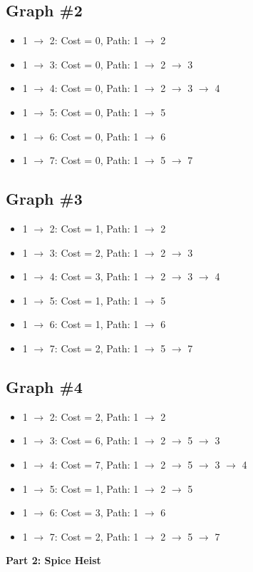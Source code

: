 \documentclass[12pt,letterpaper, onecolumn]{exam}
\begin{document}
\subsection*{Graph \#2}
\begin{itemize}[noitemsep, topsep=0pt]
    \item 1 $\rightarrow$ 2: Cost = 0, Path: 1 $\rightarrow$ 2
    \item 1 $\rightarrow$ 3: Cost = 0, Path: 1 $\rightarrow$ 2 $\rightarrow$ 3
    \item 1 $\rightarrow$ 4: Cost = 0, Path: 1 $\rightarrow$ 2 $\rightarrow$ 3 $\rightarrow$ 4
    \item 1 $\rightarrow$ 5: Cost = 0, Path: 1 $\rightarrow$ 5
    \item 1 $\rightarrow$ 6: Cost = 0, Path: 1 $\rightarrow$ 6
    \item 1 $\rightarrow$ 7: Cost = 0, Path: 1 $\rightarrow$ 5 $\rightarrow$ 7
\end{itemize}

\subsection*{Graph \#3}
\begin{itemize}[noitemsep, topsep=0pt]
    \item 1 $\rightarrow$ 2: Cost = 1, Path: 1 $\rightarrow$ 2
    \item 1 $\rightarrow$ 3: Cost = 2, Path: 1 $\rightarrow$ 2 $\rightarrow$ 3
    \item 1 $\rightarrow$ 4: Cost = 3, Path: 1 $\rightarrow$ 2 $\rightarrow$ 3 $\rightarrow$ 4
    \item 1 $\rightarrow$ 5: Cost = 1, Path: 1 $\rightarrow$ 5
    \item 1 $\rightarrow$ 6: Cost = 1, Path: 1 $\rightarrow$ 6
    \item 1 $\rightarrow$ 7: Cost = 2, Path: 1 $\rightarrow$ 5 $\rightarrow$ 7
\end{itemize}

\subsection*{Graph \#4}
\begin{itemize}[noitemsep, topsep=0pt]
    \item 1 $\rightarrow$ 2: Cost = 2, Path: 1 $\rightarrow$ 2
    \item 1 $\rightarrow$ 3: Cost = 6, Path: 1 $\rightarrow$ 2 $\rightarrow$ 5 $\rightarrow$ 3
    \item 1 $\rightarrow$ 4: Cost = 7, Path: 1 $\rightarrow$ 2 $\rightarrow$ 5 $\rightarrow$ 3 $\rightarrow$ 4
    \item 1 $\rightarrow$ 5: Cost = 1, Path: 1 $\rightarrow$ 2 $\rightarrow$ 5
    \item 1 $\rightarrow$ 6: Cost = 3, Path: 1 $\rightarrow$ 6
    \item 1 $\rightarrow$ 7: Cost = 2, Path: 1 $\rightarrow$ 2 $\rightarrow$ 5 $\rightarrow$ 7
\end{itemize}

\newpage

\noindent \textbf{Part 2: Spice Heist }

\vspace{.3cm}
\end{document}
